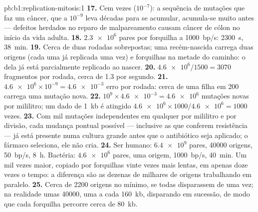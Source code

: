 \begin{solution}{pb:b1:replication-mitosis:1}
\textbf{17.} Cem vezes ($10^{-7}$): a sequência de mutações que faz um
câncer, que a $10^{-9}$ leva décadas para se acumular, acumula-se muito
antes --- defeitos herdados no reparo de malpareamento causam câncer de
cólon no início da vida adulta.
\textbf{18.} $\num{2.3e6}$ pares por forquilha a \qty{1000}{bp/s}:
\qty{2300}{s}, \qty{38}{min}.
\textbf{19.} Cerca de duas rodadas sobrepostas; uma 
recém-nascida carrega duas origens (cada uma já replicada uma vez) e
forquilhas na metade do caminho: o  dela já está parcialmente
replicado ao nascer.
\textbf{20.} $\num{4.6e6}/1500 = 3070$ fragmentos por rodada, cerca de
1.3 por segundo.
\textbf{21.} $\num{4.6e6}\times 10^{-9} = \num{4.6e-3}$ erro por
rodada: cerca de uma filha em 200 carrega uma mutação nova.
\textbf{22.} $10^9\times\num{4.6e-3} = \num{4.6e6}$ mutações novas por
mililitro; um dado  de \qty{1}{kb} é atingido $\num{4.6e6}\times
1000/\num{4.6e6} = 1000$ vezes.
\textbf{23.} Com mil mutações independentes em qualquer  por
mililitro e por divisão, cada mudança pontual possível --- inclusive as
que conferem resistência --- já está presente numa cultura grande antes
que o antibiótico seja aplicado; o fármaco seleciona, ele não cria.
\textbf{24.} Ser humano: $\num{6.4e9}$ pares, \num{40000} origens,
\qty{50}{bp/s}, \qty{8}{h}. Bactéria: $\num{4.6e6}$ pares, uma origem,
\qty{1000}{bp/s}, \qty{40}{min}. Um  mil vezes maior, copiado por
forquilhas vinte vezes mais lentas, em apenas doze vezes o tempo: a
diferença são as dezenas de milhares de origens trabalhando em paralelo.
\textbf{25.} Cerca de \num{2200} origens no mínimo, se todas
disparassem de uma vez; na realidade umas \num{40000}, uma a cada
\qty{160}{kb}, disparando em sucessão, de modo que cada forquilha
percorre cerca de \qty{80}{kb}.
\end{solution}
